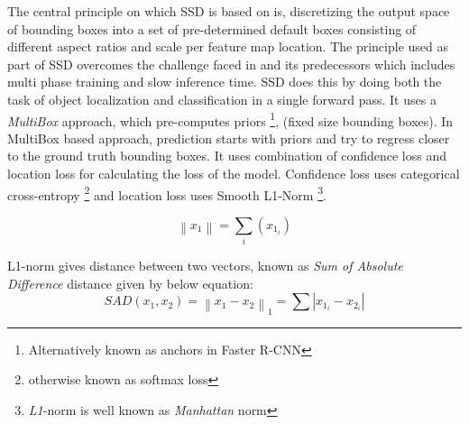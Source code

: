 \newpara The central principle on which SSD \cite{liu2016ssd} is based on is, discretizing the output space of bounding boxes into a set of pre-determined default boxes consisting of different aspect ratios and scale per feature map location. The principle used as part of SSD overcomes the challenge faced in \cite{ren2015faster} and its predecessors which includes multi phase training and slow inference time. SSD does this by doing both the task of object localization and classification in a single forward pass. It uses a \textit{MultiBox} approach, which pre-computes priors \footnote{Alternatively known as anchors in Faster R-CNN}, (fixed size bounding boxes). In MultiBox based approach, prediction starts with priors and try to regress closer to the ground truth bounding boxes.
It uses combination of confidence loss and location loss for calculating the loss of the model. Confidence loss uses categorical cross-entropy \footnote{otherwise known as softmax loss} and location loss uses Smooth L1-Norm \footnote{\textit{L1}-norm is well known as \textit{Manhattan }norm}.

\begin{equation}
	\left \| x_1 \right \| =\sum_i(x_{1_i})
\end {equation}

L1-norm gives distance between two vectors, known as \textit{Sum of Absolute Difference} distance given by below equation:
\begin{equation}
	SAD(x_1,x_2) = \left \| x_1-x_2 \right \|_1 = \sum \left | x_{1_i}-x_{2_i} \right |
\end {equation}

